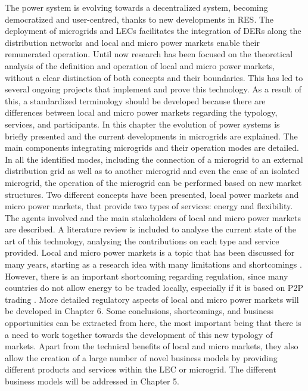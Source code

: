 The power system is evolving towards a decentralized system, becoming democratized and user-centred, thanks to new developments in RES. The deployment of microgrids and LECs facilitates the integration of DERs along the distribution networks and local and micro power markets enable their remunerated operation. Until now research has been focused on the theoretical analysis of the definition and operation of local and micro power markets, without a clear distinction of both concepts and their boundaries. This has led to several ongoing projects that implement and prove this technology. As a result of this, a standardized terminology should be developed because there are differences between local and micro power markets regarding the typology, services, and participants.
In this chapter the evolution of power systems is briefly presented and the current developments in microgrids are explained. The main components integrating microgrids and their operation modes are detailed. In all the identified modes, including the connection of a microgrid to an external distribution grid as well as to another microgrid and even the case of an isolated microgrid, the operation of the microgrid can be performed based on new market structures. Two different concepts have been presented, local power markets and micro power markets, that provide two types of services: energy and flexibility. The agents involved and the main stakeholders of local and micro power markets are described. A literature review is included to analyse the current state of the art of this technology, analysing the contributions on each type and service provided.
Local and micro power markets is a topic that has been discussed for many years, starting as a research idea with many limitations and shortcomings \cite{wu1999coordinated, blouin2001decentralized, lund2006integrated, alibhai2004distributed}. However, there is an important shortcoming regarding regulation, since many countries do not allow energy to be traded locally, especially if it is based on P2P trading \cite{DesignElectricityMarketRossetoo2017}. More detailed regulatory aspects of local and micro power markets will be developed in Chapter 6. Some conclusions, shortcomings, and business opportunities can be extracted from here, the most important being that there is a need to work together towards the development of this new typology of markets. 
Apart from the technical benefits of local and micro markets, they also allow the creation of a large number of novel business models by providing different products and services within the LEC or microgrid. The different business models will be addressed in Chapter 5.

